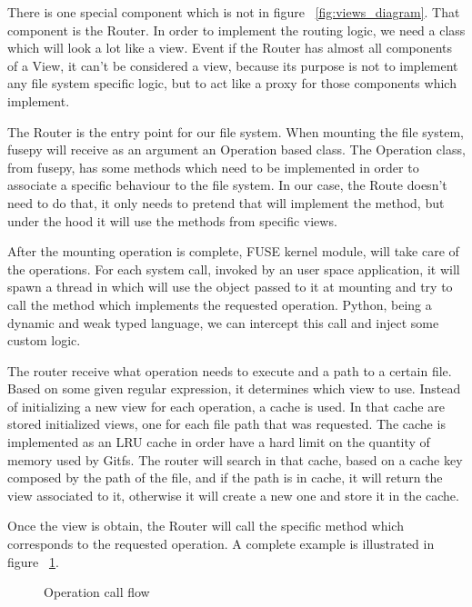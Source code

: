 There is one special component which is not in figure ~\ref{fig:views_diagram}. That component is the Router. In order to implement the routing logic, we need a class which will look a lot like a view. Event if the Router has almost all components of a View, it can't be considered a view, because its purpose is not to implement any file system specific logic, but to act like a proxy for those components which implement.

The Router is the entry point for our file system. When mounting the file system, fusepy will receive as an argument an Operation based class. The Operation class, from fusepy, has some methods which need to be implemented in order to associate a specific behaviour to the file system. In our case, the Route doesn't need to do that, it only needs to pretend that will implement the method, but under the hood it will use the methods from specific views.

After the mounting operation is complete, FUSE kernel module, will take care of the operations. For each system call, invoked by an user space application, it will spawn a thread in which will use the object passed to it at mounting and try to call the method which implements the requested operation. Python, being a dynamic and weak typed language, we can intercept this call and inject some custom logic. 

The router receive what operation needs to execute and a path to a certain file. Based on some given regular expression, it determines which view to use. Instead of initializing a new view for each operation, a cache is used. In that cache are stored initialized views, one for each file path that was requested. The cache is implemented as an LRU cache \cite{lru} in order have a hard limit on the quantity of memory used by Gitfs. The router will search in that cache, based on a cache key composed by the path of the file, and if the path is in cache, it will return the view associated to it, otherwise it will create a new one and store it in the cache.

Once the view is obtain, the Router will call the specific method which corresponds to the requested operation. A complete example is illustrated in figure ~\ref{fig:routing}.

\begin{figure}[h]
  \begin{center}
    \def\svgwidth{\columnwidth}
    
  \end{center}
  \caption{Operation call flow}
  \label{fig:routing}
\end{figure}


